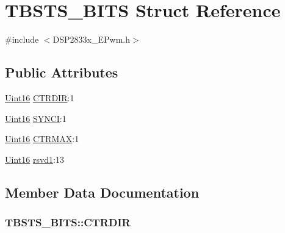 \hypertarget{struct_t_b_s_t_s___b_i_t_s}{}\section{T\+B\+S\+T\+S\+\_\+\+B\+I\+T\+S Struct Reference}
\label{struct_t_b_s_t_s___b_i_t_s}


{\ttfamily \#include $<$D\+S\+P2833x\+\_\+\+E\+Pwm.\+h$>$}

\subsection*{Public Attributes}
\begin{DoxyCompactItemize}
\item 
\hyperlink{_d_s_p2833x___device_8h_a59a9f6be4562c327cbfb4f7e8e18f08b}{Uint16} \hyperlink{struct_t_b_s_t_s___b_i_t_s_ae1ed80e30fcbe5d6a8e3d9d0cf29b5ae}{C\+T\+R\+D\+I\+R}\+:1
\item 
\hyperlink{_d_s_p2833x___device_8h_a59a9f6be4562c327cbfb4f7e8e18f08b}{Uint16} \hyperlink{struct_t_b_s_t_s___b_i_t_s_ac7a61291a04c2082310d8e75cd7beeef}{S\+Y\+N\+C\+I}\+:1
\item 
\hyperlink{_d_s_p2833x___device_8h_a59a9f6be4562c327cbfb4f7e8e18f08b}{Uint16} \hyperlink{struct_t_b_s_t_s___b_i_t_s_acc2c468bdd1013da5c8a8ec143a95656}{C\+T\+R\+M\+A\+X}\+:1
\item 
\hyperlink{_d_s_p2833x___device_8h_a59a9f6be4562c327cbfb4f7e8e18f08b}{Uint16} \hyperlink{struct_t_b_s_t_s___b_i_t_s_a2da0d8461457e5ab1b477bac21961dcc}{rsvd1}\+:13
\end{DoxyCompactItemize}


\subsection{Member Data Documentation}
\hypertarget{struct_t_b_s_t_s___b_i_t_s_ae1ed80e30fcbe5d6a8e3d9d0cf29b5ae}{}
\subsubsection[{C\+T\+R\+D\+I\+R}]{ T\+B\+S\+T\+S\+\_\+\+B\+I\+T\+S\+::\+C\+T\+R\+D\+I\+R}\label{struct_t_b_s_t_s___b_i_t_s_ae1ed80e30fcbe5d6a8e3d9d0cf29b5ae}
\hypertarget{struct_t_b_s_t_s___b_i_t_s_acc2c468bdd1013da5c8a8ec143a95656}{}

